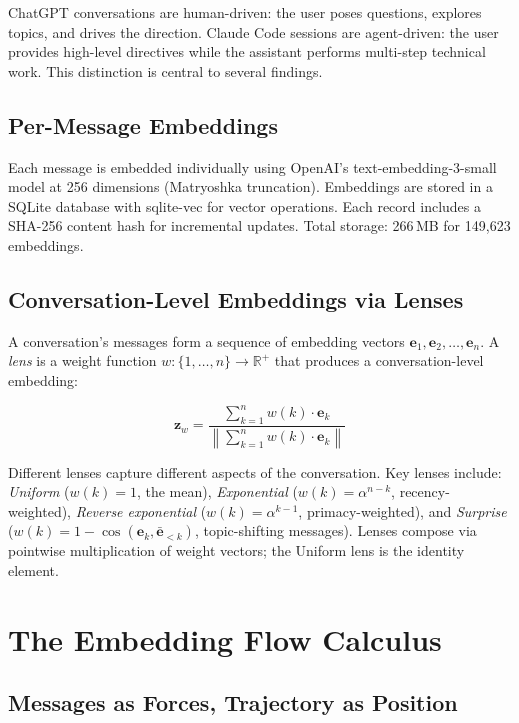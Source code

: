 \documentclass[11pt]{article}
\begin{document}
ChatGPT conversations are human-driven: the user poses questions, explores topics, and drives the direction. Claude Code sessions are agent-driven: the user provides high-level directives while the assistant performs multi-step technical work. This distinction is central to several findings.

\subsection{Per-Message Embeddings}

Each message is embedded individually using OpenAI's text-embedding-3-small model at 256 dimensions (Matryoshka truncation). Embeddings are stored in a SQLite database with sqlite-vec for vector operations. Each record includes a SHA-256 content hash for incremental updates. Total storage: 266\,MB for 149,623 embeddings.

\subsection{Conversation-Level Embeddings via Lenses}

A conversation's messages form a sequence of embedding vectors $\mathbf{e}_1, \mathbf{e}_2, \ldots, \mathbf{e}_n$. A \emph{lens} is a weight function $w: \{1,\ldots,n\} \to \mathbb{R}^+$ that produces a conversation-level embedding:

\begin{equation}
\mathbf{z}_w = \frac{\sum_{k=1}^{n} w(k) \cdot \mathbf{e}_k}{\left\|\sum_{k=1}^{n} w(k) \cdot \mathbf{e}_k\right\|}
\end{equation}

Different lenses capture different aspects of the conversation. Key lenses include: \emph{Uniform} ($w(k) = 1$, the mean), \emph{Exponential} ($w(k) = \alpha^{n-k}$, recency-weighted), \emph{Reverse exponential} ($w(k) = \alpha^{k-1}$, primacy-weighted), and \emph{Surprise} ($w(k) = 1 - \cos(\mathbf{e}_k, \bar{\mathbf{e}}_{<k})$, topic-shifting messages). Lenses compose via pointwise multiplication of weight vectors; the Uniform lens is the identity element.

\section{The Embedding Flow Calculus}

\subsection{Messages as Forces, Trajectory as Position}
\end{document}

